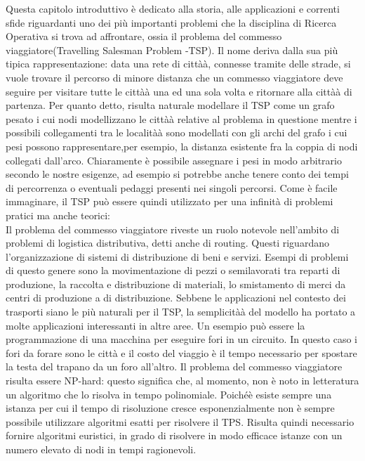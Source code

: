 \documentclass[11pt]{article}
\begin{document}
Questa capitolo introduttivo \`e dedicato alla storia, alle applicazioni e correnti sfide riguardanti uno dei pi\`u importanti problemi che la disciplina di Ricerca Operativa si trova ad affrontare, ossia il problema del commesso viaggiatore(Travelling Salesman Problem -TSP). 
Il nome deriva dalla sua pi\`u tipica rappresentazione: data una rete di città\`a, connesse tramite delle strade, si vuole trovare il percorso di minore distanza che un commesso viaggiatore deve seguire per visitare tutte le città\`a una ed una sola volta e ritornare alla città\`a di partenza. Per quanto detto, risulta naturale modellare il TSP come un grafo pesato i cui nodi modellizzano le città\`a relative al problema in questione mentre i possibili collegamenti tra le località\`a sono modellati con gli archi del grafo i cui pesi possono rappresentare,per esempio, la distanza esistente fra la coppia di nodi collegati dall’arco. Chiaramente è possibile assegnare i pesi in modo arbitrario secondo le nostre esigenze, ad esempio si potrebbe anche tenere conto dei tempi di percorrenza o eventuali pedaggi presenti nei singoli percorsi. Come è facile immaginare, il TSP può essere quindi utilizzato per una infinità di problemi pratici ma anche teorici:\\
Il problema del commesso viaggiatore riveste un ruolo notevole nell'ambito di problemi di logistica distributiva, detti anche di routing. Questi riguardano l’organizzazione di sistemi di distribuzione di beni e servizi. Esempi di problemi di questo genere sono la movimentazione di pezzi o semilavorati tra reparti di produzione, la raccolta e distribuzione di materiali, lo smistamento di merci da centri di produzione a di distribuzione.
Sebbene le applicazioni nel contesto dei trasporti siano le più naturali per il TSP, la semplicità\`a del modello ha portato a molte applicazioni interessanti in altre aree. Un esempio può essere la programmazione di una macchina per eseguire fori in un circuito. In questo caso i fori da forare sono le città e il costo del viaggio è il tempo necessario per spostare la testa del trapano da un foro all'altro. 
Il problema del commesso viaggiatore risulta essere NP-hard: questo significa che, al momento, non è noto in letteratura un algoritmo che lo risolva in tempo polinomiale. Poiché\`e esiste sempre una istanza per cui il tempo di risoluzione cresce esponenzialmente non è sempre possibile utilizzare algoritmi esatti per risolvere il TPS. Risulta quindi necessario fornire algoritmi euristici, in grado di risolvere in modo efficace istanze con un numero elevato di nodi in tempi ragionevoli.
\end{document}
